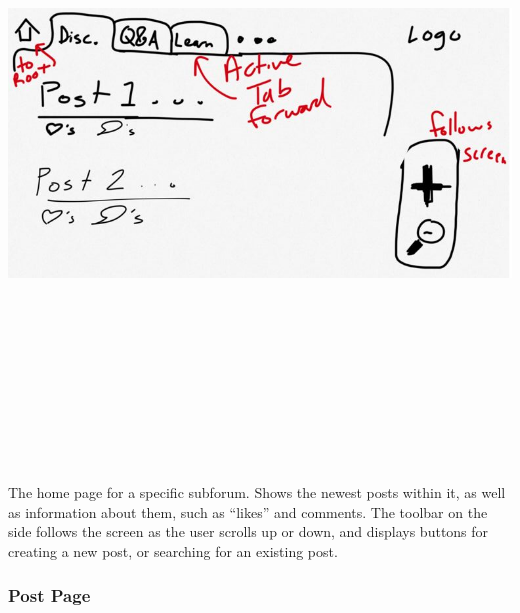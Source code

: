 \documentclass[12pt]{scrartcl}
\begin{document}
\includegraphics[width=17cm, height=17cm, keepaspectratio]{forumpage.png}

The home page for a specific subforum. Shows the newest posts within it, as well as information about them, such as “likes” and comments. The toolbar on the side follows the screen as the user scrolls up or down, and displays buttons for creating a new post, or searching for an existing post.

\subsubsection{Post Page}
\end{document}
